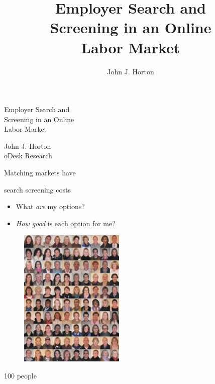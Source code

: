 \documentclass[12pt]{beamer}
\title[Employer Search and Screening in an Online Labor Market]{Employer Search and\\Screening in an Online\\Labor Market}
\author{John J. Horton}
\institute{oDesk Research}
\newcommand*\ouritem{%
\item[\color{white}\scalebox{0.9}{\textbullet}]}
\begin{document}
\setlength{\baselineskip}{12mm}
\fontsize{10mm}{12mm}\selectfont

\begin{frame}
\begin{center}
Employer Search and\\
Screening in an Online\\
Labor Market

\vspace{3mm}

\large
John J. Horton\\
oDesk Research
\end{center}
\end{frame}

\begin{frame}{}
\begin{center}
Matching markets have

search screening costs
\end{center}
\end{frame}

\begin{frame}{}
\Large
\begin{itemize}
\ouritem What \emph{are} my options?

\ouritem \emph{How good} is each option for me?
\end{itemize}
\end{frame}

\begin{frame}{}
\begin{center}
\Large
\begin{figure}[H] \centering \includegraphics[width=50mm]{people100.jpg} \end{figure}

100 people
\end{center}
\end{frame}
\end{document}
